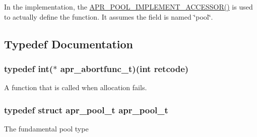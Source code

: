 In the implementation, the \hyperlink{group__apr__pools_ga43a8a52f68f8b7d3b7694c254da4a074}{A\-P\-R\-\_\-\-P\-O\-O\-L\-\_\-\-I\-M\-P\-L\-E\-M\-E\-N\-T\-\_\-\-A\-C\-C\-E\-S\-S\-O\-R()} is used to actually define the function. It assumes the field is named \char`\"{}pool\char`\"{}. 

\subsection{Typedef Documentation}
\hypertarget{group__apr__pools_ga0a1fe549a7c45b864c003ddf12115365}{
\subsubsection[{apr\-\_\-abortfunc\-\_\-t}]{\setlength{\rightskip}{0pt plus 5cm}typedef int($\ast$ apr\-\_\-abortfunc\-\_\-t)(int retcode)}}\label{group__apr__pools_ga0a1fe549a7c45b864c003ddf12115365}
A function that is called when allocation fails. \hypertarget{group__apr__pools_gaf137f28edcf9a086cd6bc36c20d7cdfb}{
\subsubsection[{apr\-\_\-pool\-\_\-t}]{\setlength{\rightskip}{0pt plus 5cm}typedef struct {\bf apr\-\_\-pool\-\_\-t} {\bf apr\-\_\-pool\-\_\-t}}}\label{group__apr__pools_gaf137f28edcf9a086cd6bc36c20d7cdfb}
The fundamental pool type 

